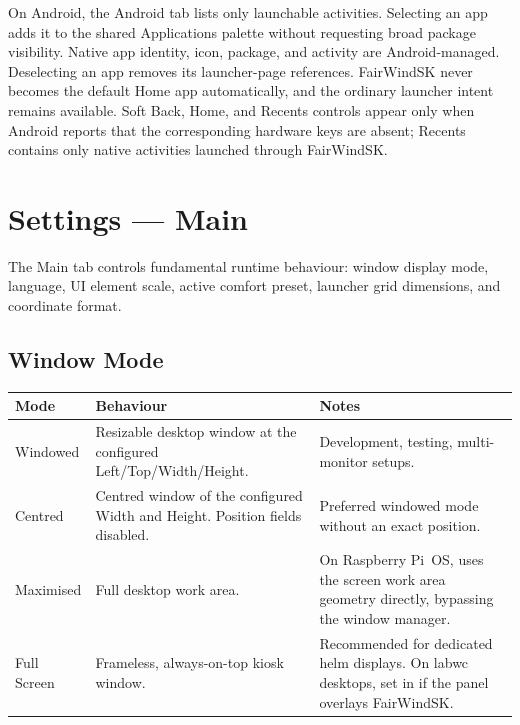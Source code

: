 On Android, the Android tab lists only launchable 
activities. Selecting an app adds it to the shared Applications palette without
requesting broad package visibility. Native app identity, icon, package, and
activity are Android-managed. Deselecting an app removes its launcher-page
references. FairWindSK never becomes the default Home app automatically, and the
ordinary launcher intent remains available. Soft Back, Home, and Recents controls
appear only when Android reports that the corresponding hardware keys are absent;
Recents contains only native activities launched through FairWindSK.

\chapter{Settings --- Main}
\label{ch:settings-main}

The Main tab controls fundamental runtime behaviour: window display mode, language, UI element
scale, active comfort preset, launcher grid dimensions, and coordinate format.


\section{Window Mode}

\begin{longtable}{L{2.4cm}L{5.6cm}L{5.7cm}}
\toprule
{}
\color{white}\sffamily\bfseries Mode &
\color{white}\sffamily\bfseries Behaviour &
\color{white}\sffamily\bfseries Notes \\
\midrule
Windowed    & Resizable desktop window at the configured Left/Top/Width/Height. &
  Development, testing, multi-monitor setups. \\
Centred     & Centred window of the configured Width and Height. Position fields disabled. &
  Preferred windowed mode without an exact position. \\
Maximised   & Full desktop work area. &
  On Raspberry Pi~OS, uses the screen work area geometry directly,
  bypassing the window manager. \\
Full Screen & Frameless, always-on-top kiosk window. &
  Recommended for dedicated helm displays.
  On labwc desktops, set 
  in  if the panel overlays FairWindSK. \\
\bottomrule
\end{longtable}

